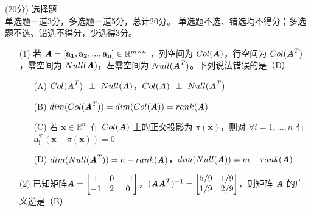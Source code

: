 \documentclass[12pt,a4paper,openany,twoside]{ctexbook}
\begin{document}
\begin{exercise}(20分)
	选择题\\
	单选题一道3分，多选题一道5分，总计20分。
	单选题不选、错选均不得分；多选题不选、错选不得分，少选得3分。

	\begin{itemize}
		\item [(1)]  若 $\boldsymbol{\mathit{A}}=[\mathbf{a_1},\mathbf{a_2},...,\mathbf{a_n}]\in {\mathbb{R}}^{m \times n}$ ，列空间为 $Col(\boldsymbol{\mathit{A}})$，行空间为 $Col(\boldsymbol{\mathit{A}}^T)$，零空间为 $Null(\boldsymbol{\mathit{A}})$，左零空间为  $Null(\boldsymbol{\mathit{A}}^T)$。下列说法错误的是（D）
		\begin{itemize}
			\item [(A)]  $Col(\boldsymbol{\mathit{A}}^T)$ $\perp$ $Null(\boldsymbol{\mathit{A}})$，$Col(\boldsymbol{\mathit{A}}) $ $\perp$ $Null(\boldsymbol{\mathit{A}}^T )$
			\item [(B)] $dim(Col(\boldsymbol{\mathit{A}}^T))=dim(Col(\boldsymbol{\mathit{A}}))=rank(\boldsymbol{\mathit{A}})$
			\item [(C)] 若 $\mathbf{x}\in {\mathbb{R}}^{m}$ 在 $Col(\boldsymbol{\mathit{A}})$ 上的正交投影为 $\pi(\mathbf{x})$，则对 $\forall i=1,...,n$ 有$\mathbf{a_i^T}(\mathbf{x}-\pi(\mathbf{x}))=0$
			\item [(D)] $dim(Null(\boldsymbol{\mathit{A}}^T))=n-rank(\boldsymbol{\mathit{A}})$，$dim(Null(\boldsymbol{\mathit{A}}))=m-rank(\boldsymbol{\mathit{A}})$
		\end{itemize}

		\item [(2)] 已知矩阵$\boldsymbol{\mathit{A}}=\begin{bmatrix}  
			1 & 0 & -1\\  
			 -1 & 2 & 0 \\  
			\end{bmatrix}$，$(\boldsymbol{\mathit{A}}\boldsymbol{\mathit{A}}^T)^{-1}=\begin{bmatrix}  
			5/9 & 1/9\\  
			1/9 & 2/9\\  
			\end{bmatrix}$，则矩阵 $\boldsymbol{\mathit{A}}$ 的广义逆是（B）


\end{itemize}
\end{exercise}
\end{document}
